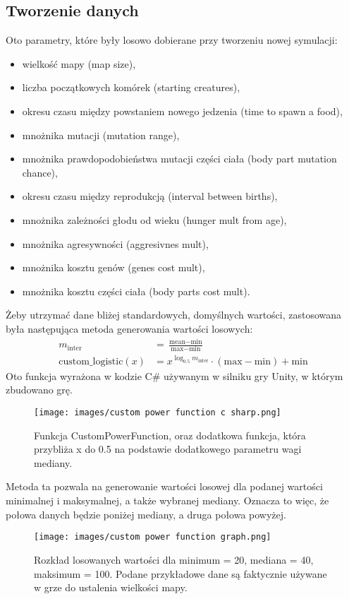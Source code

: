 \documentclass{article}
\begin{document}
\subsection{Tworzenie danych}
Oto parametry, które były losowo dobierane przy tworzeniu nowej symulacji:
\begin{itemize}[itemsep=0mm]
    \item wielkość mapy (map size),
    \item liczba początkowych komórek (starting creatures),
    \item okresu czasu między powstaniem nowego jedzenia (time to spawn a food),
    \item mnożnika mutacji (mutation range),
    \item mnożnika prawdopodobieństwa mutacji części ciała (body part mutation chance),
    \item okresu czasu między reprodukcją (interval between births),
    \item mnożnika zależności głodu od wieku (hunger mult from age),
    \item mnożnika agresywności (aggresivnes mult),
    \item mnożnika kosztu genów (genes cost mult),
    \item mnożnika kosztu części ciała (body parts cost mult).
\end{itemize}
Żeby utrzymać dane bliżej standardowych, domyślnych wartości, zastosowana była następująca metoda generowania wartości losowych:
\begin{align*}
    m_{\text{inter}} &= \frac{\text{mean} - \text{min}}{\text{max} - \text{min}} \\
    \text{custom\_logistic}(x) &= x^{\log_{0.5} m_{\text{inter}}} \cdot (\text{max} - \text{min}) + \text{min}
\end{align*}
Oto funkcja wyrażona w kodzie C\# używanym w silniku gry Unity, w którym zbudowano grę.
\begin{figure}[H]
    \centering
    \texttt{[image: images/custom power function c sharp.png]}
    \caption{Funkcja CustomPowerFunction, oraz dodatkowa funkcja, która przybliża x do 0.5 na podstawie dodatkowego parametru wagi mediany.}
\end{figure}
Metoda ta pozwala na generowanie wartości losowej dla podanej wartości minimalnej i maksymalnej, a także wybranej mediany. Oznacza to więc, że połowa danych będzie poniżej mediany, a druga połowa powyżej. 
\begin{figure}[H]
    \centering
    \texttt{[image: images/custom power function graph.png]}
    \caption{Rozkład losowanych wartości dla minimum = 20, mediana = 40, maksimum = 100. Podane przykładowe dane są faktycznie używane w grze do ustalenia wielkości mapy.}
\end{figure}
\end{document}
